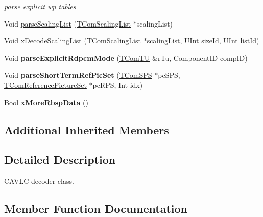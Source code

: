 \begin{DoxyCompactItemize}
\begin{DoxyCompactList}\small\item\em parse explicit wp tables \end{DoxyCompactList}\item 
Void \hyperlink{class_t_dec_cavlc_a18db3030b79ac99a4056585d01ce0b0d}{parse\+Scaling\+List} (\hyperlink{class_t_com_scaling_list}{T\+Com\+Scaling\+List} $\ast$scaling\+List)
\item 
Void \hyperlink{class_t_dec_cavlc_a41af5b4b5145a64a3668c5ca21e0f1a1}{x\+Decode\+Scaling\+List} (\hyperlink{class_t_com_scaling_list}{T\+Com\+Scaling\+List} $\ast$scaling\+List, U\+Int size\+Id, U\+Int list\+Id)
\item 
\mbox{\label{class_t_dec_cavlc_a0b7f7cd66b04672b112fb7dfe6e00ef8}} 
Void {\bfseries parse\+Explicit\+Rdpcm\+Mode} (\hyperlink{class_t_com_t_u}{T\+Com\+TU} \&r\+Tu, Component\+ID comp\+ID)
\item 
\mbox{\label{class_t_dec_cavlc_a759b3d732e0638b89e5aaaf6302e75e5}} 
Void {\bfseries parse\+Short\+Term\+Ref\+Pic\+Set} (\hyperlink{class_t_com_s_p_s}{T\+Com\+S\+PS} $\ast$pc\+S\+PS, \hyperlink{class_t_com_reference_picture_set}{T\+Com\+Reference\+Picture\+Set} $\ast$pc\+R\+PS, Int idx)
\item 
\mbox{\label{class_t_dec_cavlc_acfeded1e1e63abe0812a6cebca64ce97}} 
Bool {\bfseries x\+More\+Rbsp\+Data} ()
\end{DoxyCompactItemize}
\subsection*{Additional Inherited Members}


\subsection{Detailed Description}
C\+A\+V\+LC decoder class. 

\subsection{Member Function Documentation}
\mbox{\label{class_t_dec_cavlc_a249435b2acc75eb7b9be1eb0c89f1fed}} 
